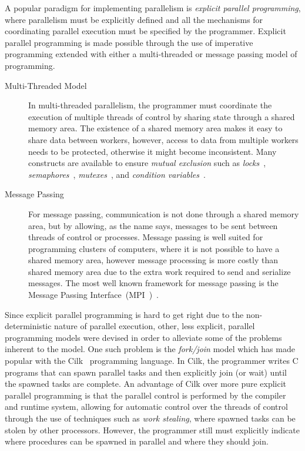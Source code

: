 A popular paradigm for implementing parallelism is \emph{explicit parallel
programming}, where parallelism must be explicitly defined and all the
mechanisms for coordinating parallel execution must be specified by the
programmer. Explicit parallel programming is made possible through the use of
imperative programming extended with either a multi-threaded or message passing
model of programming.

\begin{description}

   \item[Multi-Threaded Model] In multi-threaded parallelism, the programmer
      must coordinate the execution of multiple threads of control by sharing
      state through a shared memory area. The existence of a shared memory area
      makes it easy to share data between workers, however, access to data from
      multiple workers needs to be protected, otherwise it might become
      inconsistent. Many constructs are available to ensure \emph{mutual
      exclusion} such as \emph{locks}~\cite{Silberschatz:2008},
      \emph{semaphores}~\cite{Dijkstra:2002},
      \emph{mutexes}~\cite{Silberschatz:2008}, and \emph{condition
      variables}~\cite{Hoare:1974}.

   \item[Message Passing] For message passing, communication is not done through a
      shared memory area, but by allowing, as the name says, messages to be sent
      between threads of control or processes. Message passing is well suited for
      programming clusters of computers, where it is not possible to have a shared
      memory area, however message processing is more costly than shared memory
      area due to the extra work required to send and serialize messages.  The most
      well known framework for message passing is the Message Passing
      Interface~(MPI~)~\cite{Forum:1994}.

\end{description}


Since explicit parallel programming is hard to get right due to the
non-deterministic nature of parallel execution, other, less explicit, parallel
programming models were devised in order to alleviate some of the problems
inherent to the model. One such problem is the \emph{fork/join} model which has
made popular with the Cilk~\cite{Blumofe:1995:CEM:209936.209958} programming
language. In Cilk, the programmer writes C programs that can spawn parallel
tasks and then explicitly join (or wait) until the spawned tasks are complete.
An advantage of Cilk over more pure explicit parallel programming is that the
parallel control is performed by the compiler and runtime system, allowing for
automatic control over the threads of control through the use of techniques such
as \emph{work stealing}, where spawned tasks can be stolen by other processors.
However, the programmer still must explicitly indicate where procedures can be
spawned in parallel and where they should join.

